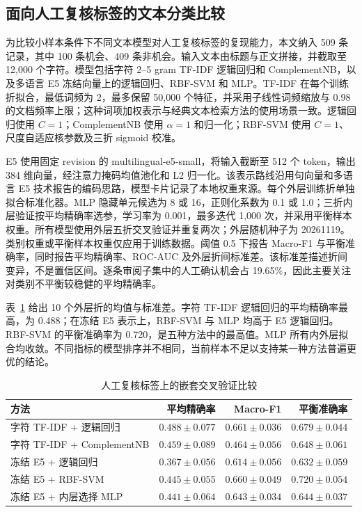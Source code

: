 \subsection{面向人工复核标签的文本分类比较}

为比较小样本条件下不同文本模型对人工复核标签的复现能力，本文纳入 509 条记录，其中 100 条机会、409 条非机会。输入文本由标题与正文拼接，并截取至 12,000 个字符。模型包括字符 2--5 gram TF-IDF 逻辑回归和 ComplementNB，以及多语言 E5 冻结向量上的逻辑回归、RBF-SVM 和 MLP。TF-IDF 在每个训练折拟合，最低词频为 2，最多保留 50,000 个特征，并采用子线性词频缩放与 0.98 的文档频率上限；这种词项加权表示与经典文本检索方法的使用场景一致\cite{salton1988}。逻辑回归使用 $C=1$；ComplementNB 使用 $\alpha=1$ 和归一化；RBF-SVM 使用 $C=1$、尺度自适应核参数及三折 sigmoid 校准。

E5 使用固定 revision 的 multilingual-e5-small，将输入截断至 512 个 token，输出 384 维向量，经注意力掩码均值池化和 L2 归一化。该表示路线沿用句向量和多语言 E5 技术报告的编码思路\cite{reimers2019,e5report}，模型卡片记录了本地权重来源\cite{e5model}。每个外层训练折单独拟合标准化器。MLP 隐藏单元候选为 8 或 16，正则化系数为 0.1 或 1.0；三折内层验证按平均精确率选参，学习率为 0.001，最多迭代 1,000 次，并采用平衡样本权重。所有模型使用外层五折交叉验证并重复两次；外层随机种子为 20261119。类别权重或平衡样本权重仅应用于训练数据。阈值 0.5 下报告 Macro-F1 与平衡准确率，同时报告平均精确率、ROC-AUC 及外层折间标准差。该标准差描述折间变异，不是置信区间。逐条审阅子集中的人工确认机会占 19.65\%，因此主要关注对类别不平衡较稳健的平均精确率。

表~\ref{tab:proxy-classifiers} 给出 10 个外层折的均值与标准差。字符 TF-IDF 逻辑回归的平均精确率最高，为 0.488；在冻结 E5 表示上，RBF-SVM 与 MLP 均高于 E5 逻辑回归。RBF-SVM 的平衡准确率为 0.720，是五种方法中的最高值。MLP 所有内外层拟合均收敛。不同指标的模型排序并不相同，当前样本不足以支持某一种方法普遍更优的结论。

\begin{table}[H]
  \centering
  \small
  \caption[人工复核标签上的嵌套交叉验证结果]{人工复核标签上的嵌套交叉验证比较}
  \label{tab:proxy-classifiers}
  \begin{tabular}{lrrr}
    \toprule
    方法 & 平均精确率 & Macro-F1 & 平衡准确率 \\
    \midrule
    字符 TF-IDF + 逻辑回归 & $0.488\pm0.077$ & $0.661\pm0.036$ & $0.679\pm0.044$ \\
    字符 TF-IDF + ComplementNB & $0.459\pm0.089$ & $0.464\pm0.056$ & $0.648\pm0.061$ \\
    冻结 E5 + 逻辑回归 & $0.367\pm0.056$ & $0.614\pm0.056$ & $0.632\pm0.059$ \\
    冻结 E5 + RBF-SVM & $0.445\pm0.055$ & $0.660\pm0.049$ & $0.720\pm0.054$ \\
    冻结 E5 + 内层选择 MLP & $0.441\pm0.064$ & $0.643\pm0.034$ & $0.644\pm0.037$ \\
    \bottomrule
  \end{tabular}
\end{table}

